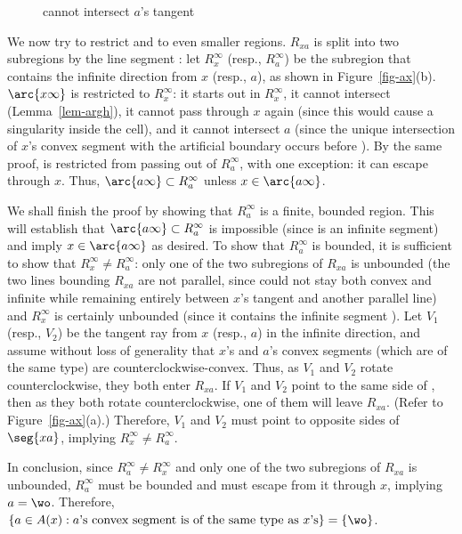 \begin{figure}[bp]\vspace{2in}\caption{ cannot intersect $a$'s tangent}\label{fig.chick}\end{figure}

We now try to restrict  and  to even smaller regions.
$R_{xa}$ is split into two subregions by the line segment :
let $R_{x}^{\infty}$ (resp., $R_{a}^{\infty}$) be the subregion that contains 
the infinite direction from $x$ (resp., $a$), as shown in Figure~\ref{fig-ax}(b).
$\arc{x\infty}$ is restricted to $R_{x}^{\infty}$:
it starts out in $R_{x}^{\infty}$, it cannot intersect 
(Lemma~\ref{lem-argh}), 
it cannot pass through $x$ again (since this would cause
a singularity inside the cell),
and it cannot intersect $a$ (since the unique intersection of $x$'s convex segment 
with the artificial boundary occurs before ).
By the same proof,  is restricted from passing out of $R_{a}^{\infty}$,
with one exception: it can escape through $x$.
Thus, $\arc{a\infty} \subset R_{a}^{\infty}$ unless $x \in \arc{a\infty}$.

We shall finish the proof by showing
that $R_{a}^{\infty}$ is a finite, bounded region.
This will establish that $\arc{a\infty} \subset R_{a}^{\infty}$
is impossible (since  is an infinite segment) and 
imply $x \in \arc{a\infty}$ as desired.
To show that $R_{a}^{\infty}$ is bounded, 
it is sufficient to show that $R_{x}^{\infty} \neq R_{a}^{\infty}$:
only one of the two subregions of $R_{xa}$ is unbounded (the 
	two lines bounding $R_{xa}$ are not parallel,
	since  could not stay both convex
	and infinite while remaining entirely between 
	$x$'s tangent and another parallel line)
and $R_{x}^{\infty}$ is certainly unbounded (since
it contains the infinite segment ).
Let $V_{1}$ (resp., $V_{2}$) be the tangent ray from $x$ (resp., $a$) 
in the infinite direction, and assume without loss of generality 
that $x$'s and $a$'s convex segments 
(which are of the same type) are counterclockwise-convex.
Thus, as $V_{1}$ and $V_{2}$ rotate counterclockwise, they both enter $R_{xa}$.
If $V_{1}$ and $V_{2}$ point to the same side of ,
then as they both rotate counterclockwise, one of them will leave $R_{xa}$.
(Refer to Figure~\ref{fig-ax}(a).)
Therefore, $V_{1}$ and $V_{2}$ must point to opposite sides of $\seg{xa}$,
implying $R_{x}^{\infty} \neq R_{a}^{\infty}$.

In conclusion, since $R_{a}^{\infty} \neq R_{x}^{\infty}$ and only one of 
the two subregions of $R_{xa}$ is unbounded, 
$R_{a}^{\infty}$ must be bounded and  must escape from it through
$x$, implying $a = \wo$.
Therefore, $\{a \in A(x): 
\mbox{$a$'s convex segment is of the same type as $x$'s}\} = \{\wo\}$.
\QED


